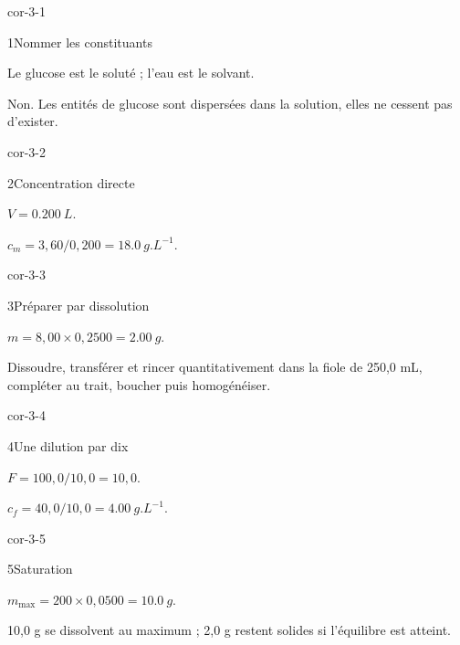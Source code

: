 \clearpage{}
\corrigesSouples
\begin{blocLivre}{cor-3-1}\begin{corrige}{1}{Nommer les constituants}
\begin{questions}
\item Le glucose est le soluté ; l’eau est le solvant.
\item Non. Les entités de glucose sont dispersées dans la solution, elles ne cessent pas d’exister.
\end{questions}
\end{corrige}\end{blocLivre}
\begin{blocLivre}{cor-3-2}\begin{corrige}{2}{Concentration directe}
\begin{questions}
\item $V=\qty{0,200}{L}$.
\item $c_m=3,60/0,200=\qty{18,0}{g.L^{-1}}$.
\end{questions}
\end{corrige}\end{blocLivre}
\begin{blocLivre}{cor-3-3}\begin{corrige}{3}{Préparer par dissolution}
\begin{questions}
\item $m=8,00\times0,2500=\qty{2,00}{g}$.
\item Dissoudre, transférer et rincer quantitativement dans la fiole de 250,0 mL, compléter au trait, boucher puis homogénéiser.
\end{questions}
\end{corrige}\end{blocLivre}
\begin{blocLivre}{cor-3-4}\begin{corrige}{4}{Une dilution par dix}
\begin{questions}
\item $F=100,0/10,0=10,0$.
\item $c_f=40,0/10,0=\qty{4,00}{g.L^{-1}}$.
\end{questions}
\end{corrige}\end{blocLivre}
\begin{blocLivre}{cor-3-5}\begin{corrige}{5}{Saturation}
\begin{questions}
\item $m_{\max}=200\times0,0500=\qty{10,0}{g}$.
\item 10,0 g se dissolvent au maximum ; 2,0 g restent solides si l’équilibre est atteint.
\end{questions}
\end{corrige}\end{blocLivre}
